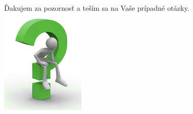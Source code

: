 \begin{frame}
\vfill
\begin{center}
{\LARGE Ďakujem za pozornosť a teším sa na Vaše prípadné otázky.\\}
  \includegraphics[width=0.3\textwidth]{obr/otazky.jpg}
\end{center}
\vfill
\end{frame}